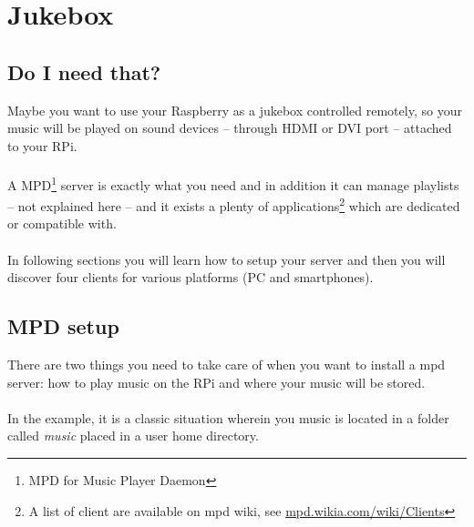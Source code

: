 \chapter{Jukebox}
\section{Do I need that?}
Maybe you want to use your Raspberry as a jukebox controlled remotely, so your 
music will be played on sound devices -- through HDMI or DVI port -- attached to 
your RPi.
\\\\
A MPD\footnote{MPD for Music Player Daemon} server is exactly what you need and in 
addition it can manage playlists -- not explained here -- and it exists a plenty 
of applications\footnote{A list of client are available on mpd wiki, see 
\href{http://mpd.wikia.com/wiki/Clients}{mpd.wikia.com/wiki/Clients}} which are 
dedicated or compatible with. 
\\\\
In following sections you will learn how to setup your server and then you will 
discover four clients for various platforms (PC and smartphones).

\section{MPD setup}\label{section:MpdSetup}

There are two things you need to take care of when you want to install a mpd 
server: how to play music on the RPi and where your music will be stored. 
\\\\
In the example, it is a \og{}classic\fg{} situation wherein you music is located 
in a folder called \emph{music} placed in a user home directory.

